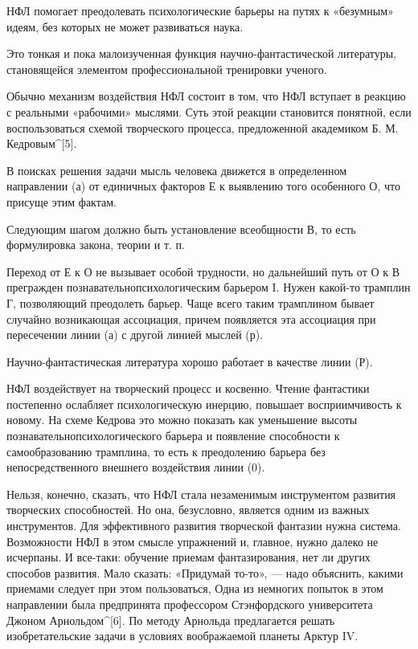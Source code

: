 НФЛ помогает преодолевать  психологические барьеры на  путях к  «безумным»
идеям, без которых не может развиваться наука.

Это тонкая и пока малоизученная функция научно-фантастической  литературы,
становящейся элементом профессиональной тренировки ученого.

Обычно механизм воздействия НФЛ состоит в том, что НФЛ вступает в  реакцию
с реальными  «рабочими» мыслями.  Суть этой  реакции становится  понятной,
если воспользоваться схемой творческого процесса, предложенной  академиком
Б. М. Кедровым^[5].

В  поисках  решения   задачи  мысль  человека   движется  в   определенном
направлении (а) от единичных факторов Е к выявлению того особенного О, что
присуще этим фактам.

Следующим  шагом  должно   быть  установление  всеобщности   В,  то   есть
формулировка закона, теории и т. п.

Переход от Е к О не вызывает особой трудности, но дальнейший путь от О к В
прегражден  познавательнопсихологическим   барьером  I.   Нужен   какой-то
трамплин Г,  позволяющий преодолеть  барьер. Чаще  всего таким  трамплином
бывает случайно возникающая ассоциация,  причем появляется эта  ассоциация
при пересечении линии (а) с другой линией мыслей (р).

Научно-фантастическая литература хорошо работает в качестве линии (Р).

НФЛ воздействует  на  творческий  процесс и  косвенно.  Чтение  фантастики
постепенно ослабляет психологическую  инерцию, повышает восприимчивость  к
новому.  На  схеме  Кедрова  это  можно  показать  как  уменьшение  высоты
познавательнопсихологического   барьера   и   появление   способности    к
самообразованию   трамплина,   то   есть   к   преодолению   барьера   без
непосредственного внешнего воздействия линии (0).

Нельзя, конечно, сказать, что НФЛ стала незаменимым инструментом  развития
творческих способностей.  Но она,  безусловно,  является одним  из  важных
инструментов. Для эффективного развития творческой фантазии нужна система.
Возможности НФЛ  в этом  смысле  упражнений и,  главное, нужно  далеко  не
исчерпаны. И  все-таки: обучение  приемам  фантазирования, нет  ли  других
способов развития.  Мало  сказать:  «Придумай то-то»,  —  надо  объяснить,
какими приемами следует при этом пользоваться, Одна из немногих попыток  в
этом направлении была  предпринята профессором Стэнфордского  университета
Джоном   Арнольдом^[6].   По    методу   Арнольда   предлагается    решать
изобретательские задачи в условиях воображаемой планеты Арктур IV.


